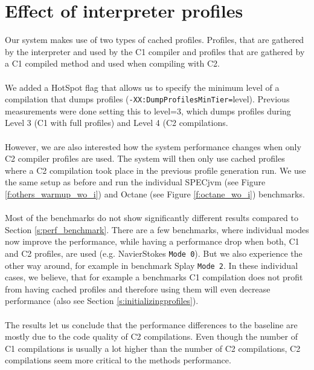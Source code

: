 \section{Effect of interpreter profiles}
\label{s:perf_interpreter_profiles}
Our system makes use of two types of cached profiles. Profiles, that are gathered by the interpreter and used by the C1 compiler and profiles that are gathered by a C1 compiled method and used when compiling with C2.
\\\\
We added a HotSpot flag that allows us to specify the minimum level of a compilation that dumps profiles (\texttt{-XX:DumpProfilesMinTier=}level).
Previous measurements were done setting this to level=3, which dumps profiles during Level 3 (C1 with full profiles) and Level 4 (C2 compilations.
\\\\
However, we are also interested how the system performance changes when only C2 compiler profiles are used. The system will then only use cached profiles where a C2 compilation took place in the previous profile generation run. We use the same setup as before and run the individual SPECjvm (see Figure \ref{f:others_warmup_wo_i}) and Octane (see Figure \ref{f:octane_wo_i}) benchmarks. 
\\\\
Most of the benchmarks do not show significantly different results compared to Section \ref{s:perf_benchmark}. There are a few benchmarks, where individual modes now improve the performance, while having a performance drop when both, C1 and C2 profiles, are used (e.g. NavierStokes \texttt{Mode 0}). But we also experience the other way around, for example in benchmark Splay \texttt{Mode 2}. In these individual cases, we believe, that for example a benchmarks C1 compilation does not profit from having cached profiles and therefore using them will even decrease performance (also see Section \ref{s:initializingprofiles}).
\\\\
The results let us conclude that the performance differences to the baseline are mostly due to the code quality of C2 compilations. Even though the number of C1 compilations is usually a lot higher than the number of C2 compilations, C2 compilations seem more critical to the methods performance.
